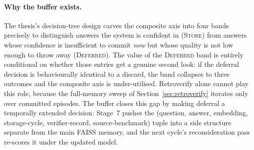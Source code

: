 \paragraph{Why the buffer exists.}
The thesis's decision-tree design carves the composite axis into four bands precisely to distinguish answers the system is confident in (\textsc{Store}) from answers whose confidence is insufficient to commit \emph{now} but whose quality is not low enough to throw away (\textsc{Deferred}). The value of the \textsc{Deferred} band is entirely conditional on whether those entries get a genuine second look: if the deferral decision is behaviourally identical to a discard, the band collapses to three outcomes and the composite axis is under-utilised. Retroverify alone cannot play this role, because the full-memory sweep of Section~\ref{sec:retroverify} iterates only over committed episodes. The buffer closes this gap by making deferral a temporally extended decision: Stage~7 pushes the (question, answer, embedding, storage-cycle, verifier-record, source-benchmark) tuple into a side structure separate from the main FAISS memory, and the next cycle's reconsideration pass re-scores it under the updated model.

